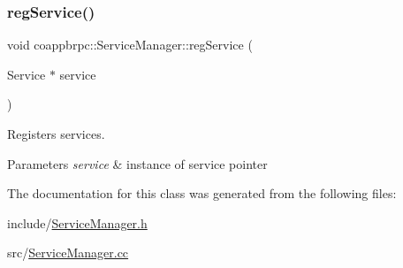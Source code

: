 \subsubsection{\texorpdfstring{reg\+Service()}{regService()}}
{\footnotesize\ttfamily void coappbrpc\+::\+Service\+Manager\+::reg\+Service (\begin{DoxyParamCaption}\item[{Service $\ast$}]{service }\end{DoxyParamCaption})}



Registers services. 


\begin{DoxyParams}{Parameters}
{\em service} & instance of service pointer \\
\hline
\end{DoxyParams}


The documentation for this class was generated from the following files\+:\begin{DoxyCompactItemize}
\item 
include/\hyperlink{ServiceManager_8h}{Service\+Manager.\+h}\item 
src/\hyperlink{ServiceManager_8cc}{Service\+Manager.\+cc}\end{DoxyCompactItemize}
